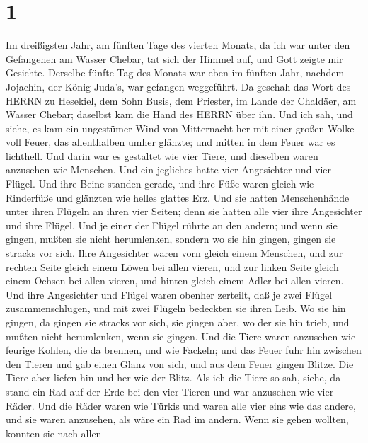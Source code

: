 \hypertarget{section}{%
\section{1}\label{section}}

 Im dreißigsten Jahr, am fünften Tage des vierten Monats, da
ich war unter den Gefangenen am Wasser Chebar, tat sich der Himmel auf,
und Gott zeigte mir Gesichte.  Derselbe fünfte Tag des
Monats war eben im fünften Jahr, nachdem Jojachin, der König Juda's, war
gefangen weggeführt.  Da geschah das Wort des HERRN zu
Hesekiel, dem Sohn Busis, dem Priester, im Lande der Chaldäer, am Wasser
Chebar; daselbst kam die Hand des HERRN über ihn.  Und ich
sah, und siehe, es kam ein ungestümer Wind von Mitternacht her mit einer
großen Wolke voll Feuer, das allenthalben umher glänzte; und mitten in
dem Feuer war es lichthell.  Und darin war es gestaltet wie
vier Tiere, und dieselben waren anzusehen wie Menschen.  Und
ein jegliches hatte vier Angesichter und vier Flügel.  Und
ihre Beine standen gerade, und ihre Füße waren gleich wie Rinderfüße und
glänzten wie helles glattes Erz.  Und sie hatten
Menschenhände unter ihren Flügeln an ihren vier Seiten; denn sie hatten
alle vier ihre Angesichter und ihre Flügel.  Und je einer
der Flügel rührte an den andern; und wenn sie gingen, mußten sie nicht
herumlenken, sondern wo sie hin gingen, gingen sie stracks vor sich.
 Ihre Angesichter waren vorn gleich einem Menschen, und zur
rechten Seite gleich einem Löwen bei allen vieren, und zur linken Seite
gleich einem Ochsen bei allen vieren, und hinten gleich einem Adler bei
allen vieren.  Und ihre Angesichter und Flügel waren
obenher zerteilt, daß je zwei Flügel zusammenschlugen, und mit zwei
Flügeln bedeckten sie ihren Leib.  Wo sie hin gingen, da
gingen sie stracks vor sich, sie gingen aber, wo der sie hin trieb, und
mußten nicht herumlenken, wenn sie gingen.  Und die Tiere
waren anzusehen wie feurige Kohlen, die da brennen, und wie Fackeln; und
das Feuer fuhr hin zwischen den Tieren und gab einen Glanz von sich, und
aus dem Feuer gingen Blitze.  Die Tiere aber liefen hin und
her wie der Blitz.  Als ich die Tiere so sah, siehe, da
stand ein Rad auf der Erde bei den vier Tieren und war anzusehen wie
vier Räder.  Und die Räder waren wie Türkis und waren alle
vier eins wie das andere, und sie waren anzusehen, als wäre ein Rad im
andern.  Wenn sie gehen wollten, konnten sie nach allen
